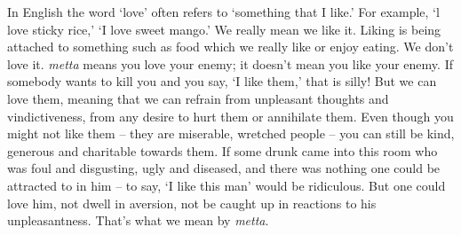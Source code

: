 
In English the word `love' often refers to `something that I like.' For example, `l love sticky rice,' `I love sweet mango.' We really mean we like it. Liking is being attached to something such as food which we really like or enjoy eating. We don't love it. \textit{metta} means you love your enemy; it doesn't mean you like your enemy. If somebody wants to kill you and you say, `I like them,' that is silly! But we can love them, meaning that we can refrain from unpleasant thoughts and vindictiveness, from any desire to hurt them or annihilate them. Even though you might not like them -- they are miserable, wretched people -- you can still be kind, generous and charitable towards them. If some drunk came into this room who was foul and disgusting, ugly and diseased, and there was nothing one could be attracted to in him -- to say, `I like this man' would be ridiculous. But one could love him, not dwell in aversion, not be caught up in reactions to his unpleasantness. That's what we mean by \textit{metta}.

